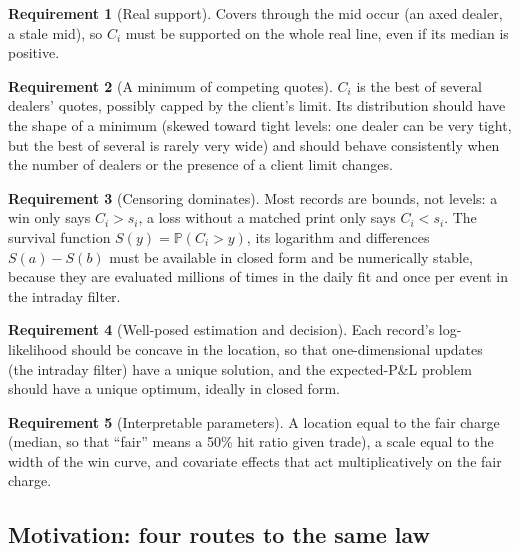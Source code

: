 \documentclass[11pt,a4paper]{article}
\theoremstyle{definition}
\newtheorem{requirement}{Requirement}
\theoremstyle{remark}
\newcommand{\Prob}{\mathbb{P}}
\begin{document}
\begin{requirement}[Real support]\label{req:support}
Covers through the mid occur (an axed dealer, a stale mid), so $C_i$ must be supported on the whole real line, even if its median is positive.
\end{requirement}

\begin{requirement}[A minimum of competing quotes]\label{req:min}
$C_i$ is the best of several dealers' quotes, possibly capped by the client's limit. Its distribution should have the shape of a minimum (skewed toward tight levels: one dealer can be very tight, but the best of several is rarely very wide) and should behave consistently when the number of dealers or the presence of a client limit changes.
\end{requirement}

\begin{requirement}[Censoring dominates]\label{req:censoring}
Most records are bounds, not levels: a win only says $C_i>s_i$, a loss without a matched print only says $C_i<s_i$. The survival function $S(y)=\Prob(C_i>y)$, its logarithm and differences $S(a)-S(b)$ must be available in closed form and be numerically stable, because they are evaluated millions of times in the daily fit and once per event in the intraday filter.
\end{requirement}

\begin{requirement}[Well-posed estimation and decision]\label{req:concave}
Each record's log-likelihood should be concave in the location, so that one-dimensional updates (the intraday filter) have a unique solution, and the expected-P\&L problem should have a unique optimum, ideally in closed form.
\end{requirement}

\begin{requirement}[Interpretable parameters]\label{req:interp}
A location equal to the fair charge (median, so that ``fair'' means a 50\% hit ratio given trade), a scale equal to the width of the win curve, and covariate effects that act multiplicatively on the fair charge.
\end{requirement}

\subsection{Motivation: four routes to the same law}\label{sec:motivation}
\end{document}
